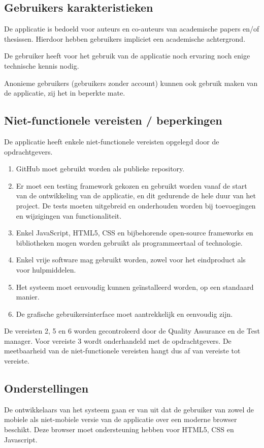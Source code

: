 \subsection{Gebruikers karakteristieken}

De applicatie is bedoeld voor auteurs en co-auteurs van academische papers en/of thesissen. Hierdoor hebben gebruikers impliciet een academische achtergrond.

De gebruiker heeft voor het gebruik van de applicatie noch ervaring noch enige technische kennis nodig.

Anonieme gebruikers (gebruikers zonder account) kunnen ook gebruik maken van de applicatie, zij het in beperkte mate. 

\subsection{Niet-functionele vereisten / beperkingen}

De applicatie heeft enkele niet-functionele vereisten opgelegd door de opdrachtgevers.
\begin{enumerate}
\item GitHub moet gebruikt worden als publieke repository.

\item Er moet een testing framework gekozen en gebruikt worden vanaf de start van de ontwikkeling van de applicatie, en dit gedurende de hele duur van het project. De tests moeten uitgebreid en onderhouden worden bij toevoegingen en wijzigingen van functionaliteit.

\item Enkel JavaScript, HTML5, CSS en bijbehorende open-source frameworks en bibliotheken mogen worden gebruikt als programmeertaal of technologie.

\item Enkel vrije software mag gebruikt worden, zowel voor het eindproduct als voor hulpmiddelen.

\item Het systeem moet eenvoudig kunnen geïnstalleerd worden, op een standaard manier.

\item De grafische gebruikersinterface moet aantrekkelijk en eenvoudig zijn.

\end{enumerate}

De vereisten 2, 5 en 6 worden gecontroleerd door de Quality Assurance en de Test manager. Voor vereiste 3 wordt onderhandeld met de opdrachtgevers. De meetbaarheid van de niet-functionele vereisten hangt dus af van vereiste tot vereiste.

\subsection{Onderstellingen}

De ontwikkelaars van het systeem gaan er van uit dat de gebruiker van zowel de mobiele als niet-mobiele versie van de applicatie over een moderne browser beschikt. Deze browser moet ondersteuning hebben voor HTML5, CSS en Javascript. 